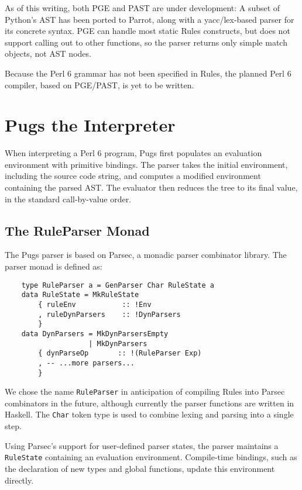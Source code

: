 \documentclass[]{sigplanconf}
\newcommand{\code}[1]{\texttt{#1}}
\begin{document}
As of this writing, both PGE and PAST are under development:  A subset of
Python's AST has been ported to Parrot, along with a yacc/lex-based parser for
its concrete syntax.  PGE can handle most static Rules constructs, but does not
support calling out to other functions, so the parser returns only simple match
objects, not AST nodes.

Because the Perl 6 grammar has not been specified in Rules, the planned Perl 6
compiler, based on PGE/PAST, is yet to be written.

\section{Pugs the Interpreter}
\label{sec:PugstheInterpreter}

When interpreting a Perl 6 program, Pugs first populates an evaluation
environment with primitive bindings.  The parser takes the initial
environment, including the source code string, and computes a modified
environment containing the parsed AST.  The evaluator then reduces the tree
to its final value, in the standard call-by-value order.

\subsection{The RuleParser Monad}
\label{sec:TheRuleParserMonad}

The Pugs parser is based on Parsec, a monadic parser combinator library.  The
parser monad is defined as:

\begin{lstlisting}
    type RuleParser a = GenParser Char RuleState a
    data RuleState = MkRuleState
        { ruleEnv           :: !Env
        , ruleDynParsers    :: !DynParsers
        }
    data DynParsers = MkDynParsersEmpty
                    | MkDynParsers
        { dynParseOp       :: !(RuleParser Exp)
        , -- ...more parsers...
        }
\end{lstlisting}

We chose the name \code{RuleParser} in anticipation of compiling Rules into
Parsec combinators in the future, although currently the parser functions are
written in Haskell.  The \code{Char} token type is used to combine lexing and
parsing into a single step.

Using Parsec's support for user-defined parser states, the parser maintains a
\code{RuleState} containing an evaluation environment.  Compile-time bindings, such as
the declaration of new types and global functions, update this environment
directly.
\end{document}
